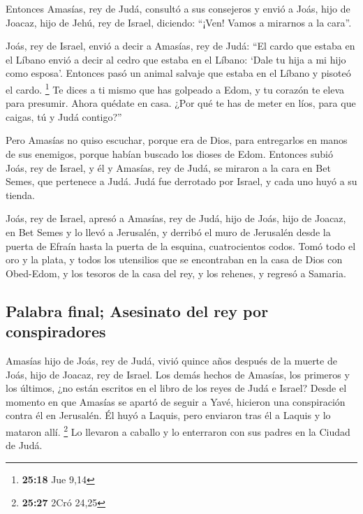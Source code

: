  Entonces Amasías, rey de Judá, consultó a sus consejeros
y envió a Joás, hijo de Joacaz, hijo de Jehú, rey de Israel, diciendo:
``¡Ven! Vamos a mirarnos a la cara''.

 Joás, rey de Israel, envió a decir a Amasías, rey de
Judá: ``El cardo que estaba en el Líbano envió a decir al cedro que
estaba en el Líbano: `Dale tu hija a mi hijo como esposa'. Entonces pasó
un animal salvaje que estaba en el Líbano y pisoteó el cardo.
\footnote{\textbf{25:18} Jue 9,14}  Te dices a ti mismo
que has golpeado a Edom, y tu corazón te eleva para presumir. Ahora
quédate en casa. ¿Por qué te has de meter en líos, para que caigas, tú y
Judá contigo?''

 Pero Amasías no quiso escuchar, porque era de Dios, para
entregarlos en manos de sus enemigos, porque habían buscado los dioses
de Edom.  Entonces subió Joás, rey de Israel, y él y
Amasías, rey de Judá, se miraron a la cara en Bet Semes, que pertenece a
Judá.  Judá fue derrotado por Israel, y cada uno huyó a
su tienda.

 Joás, rey de Israel, apresó a Amasías, rey de Judá, hijo
de Joás, hijo de Joacaz, en Bet Semes y lo llevó a Jerusalén, y derribó
el muro de Jerusalén desde la puerta de Efraín hasta la puerta de la
esquina, cuatrocientos codos.  Tomó todo el oro y la
plata, y todos los utensilios que se encontraban en la casa de Dios con
Obed-Edom, y los tesoros de la casa del rey, y los rehenes, y regresó a
Samaria.

\hypertarget{palabra-final-asesinato-del-rey-por-conspiradores}{%
\subsection{Palabra final; Asesinato del rey por
conspiradores}\label{palabra-final-asesinato-del-rey-por-conspiradores}}

 Amasías hijo de Joás, rey de Judá, vivió quince años
después de la muerte de Joás, hijo de Joacaz, rey de Israel.
 Los demás hechos de Amasías, los primeros y los últimos,
¿no están escritos en el libro de los reyes de Judá e Israel?
 Desde el momento en que Amasías se apartó de seguir a
Yavé, hicieron una conspiración contra él en Jerusalén. Él huyó a
Laquis, pero enviaron tras él a Laquis y lo mataron allí. \footnote{\textbf{25:27}
  2Cró 24,25}  Lo llevaron a caballo y lo enterraron con
sus padres en la Ciudad de Judá.

